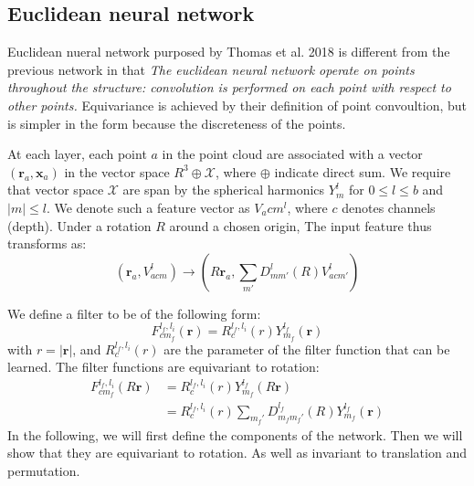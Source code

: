 \documentclass{article}
\begin{document}
\subsection*{Euclidean neural network}

Euclidean nueral network purposed by Thomas et al. 2018\cite{thomas_tensor_2018} is different from the previous network in that
\emph{The euclidean neural network operate on points throughout the structure: convolution is performed on each point with respect to other points.}
Equivariance is achieved by their definition of point convoultion, but is simpler in the form because the discreteness of the 
points.

At each layer, each point $a$ in the point cloud are associated with a vector $(\mathbf{r}_a, \mathbf{x}_a)$ 
in the vector space $R^3 \oplus \mathcal{X}$, where $\oplus$ indicate direct sum. We require that vector space $\mathcal{X}$ are span 
by the spherical harmonics $Y_m^l$ for $0\leq l \leq b$ and $|m|\leq l$. We denote such a feature 
vector as $V_acm^l$, where $c$ denotes channels (depth). 
Under a rotation $R$ around a chosen origin, The input feature thus transforms as:
\begin{equation}
    (\mathbf{r}_{a}, V_{acm}^l) \to (R \mathbf{r}_{a}, \sum_{m'}D_{mm'}^l(R)V_{acm'}^l) \label{E:3dnn_rotation_input}
\end{equation}

We define a filter to be of the following form:
\begin{equation}
    F_{cm_f}^{l_f, l_i}(\mathbf{r}) =  R_c^{l_f, l_i} (r) Y_{m_f}^{l_f}(\mathbf{r})
\end{equation}
with $r = |\mathbf{r}|$, and $R_c^{l_f, l_i} (r)$ are the parameter of the filter function that can be learned.
The filter functions are equivariant to rotation:
\begin{align}
    F_{cm_f}^{l_f, l_i}(R\mathbf{r}) &= R_c^{l_f, l_i} (r) Y_{m_f}^{l_f}(R\mathbf{r}) \\
    &= R_c^{l_f, l_i} (r) \sum_{m_f'} D_{m_fm_f'}^{l_f}(R)  Y_{m_f}^{l_f}(\mathbf{r})
\end{align}
In the following, we will first define the components of the network.
Then we will show that they are equivariant to rotation. As well as 
invariant to translation and permutation.
\end{document}
